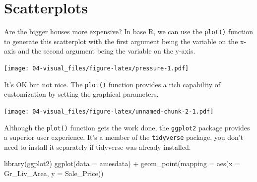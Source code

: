 \documentclass[
]{book}
\newenvironment{Shaded}{\begin{snugshade}}{\end{snugshade}}
\newcommand{\AttributeTok}[1]{\textcolor[rgb]{0.77,0.63,0.00}{#1}}
\newcommand{\CommentTok}[1]{\textcolor[rgb]{0.56,0.35,0.01}{\textit{#1}}}
\newcommand{\DecValTok}[1]{\textcolor[rgb]{0.00,0.00,0.81}{#1}}
\newcommand{\FunctionTok}[1]{\textcolor[rgb]{0.00,0.00,0.00}{#1}}
\newcommand{\NormalTok}[1]{#1}
\newcommand{\SpecialCharTok}[1]{\textcolor[rgb]{0.00,0.00,0.00}{#1}}
\newcommand{\StringTok}[1]{\textcolor[rgb]{0.31,0.60,0.02}{#1}}
\theoremstyle{definition}
\theoremstyle{definition}
\theoremstyle{definition}
\theoremstyle{definition}
\theoremstyle{remark}
\begin{document}
\hypertarget{scatterplots}{%
\section{Scatterplots}\label{scatterplots}}

Are the bigger houses more expensive? In base R, we can use the \texttt{plot()} function to generate this scatterplot with the first argument being the variable on the x-axis and the second argument being the variable on the y-axis.

\texttt{[image: 04-visual\_files/figure-latex/pressure-1.pdf]}

It's OK but not nice. The \texttt{plot()} function provides a rich capability of customization by setting the graphical parameters.

\begin{Shaded}
\end{Shaded}

\texttt{[image: 04-visual\_files/figure-latex/unnamed-chunk-2-1.pdf]}

Although the \texttt{plot()} function gets the work done, the \texttt{ggplot2} package provides a superior user experience. It's a member of the \texttt{tidyverse} package, you don't need to install it separately if tidyverse was already installed.

\begin{Shaded}
\begin{Highlighting}[]
\FunctionTok{library}\NormalTok{(ggplot2)}
\FunctionTok{ggplot}\NormalTok{(}\AttributeTok{data =}\NormalTok{ amesdata) }\SpecialCharTok{+} 
  \FunctionTok{geom\_point}\NormalTok{(}\AttributeTok{mapping =} \FunctionTok{aes}\NormalTok{(}\AttributeTok{x =}\NormalTok{ Gr\_Liv\_Area, }\AttributeTok{y =}\NormalTok{ Sale\_Price))}
\end{Highlighting}
\end{Shaded}
\end{document}
